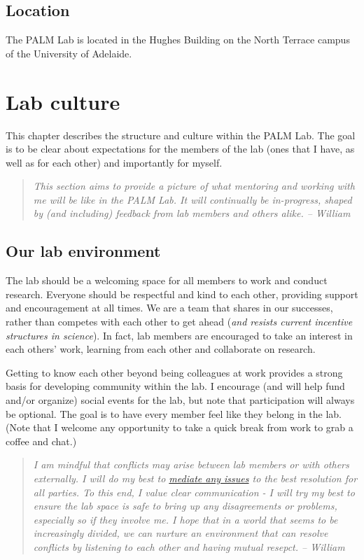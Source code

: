 \documentclass[
]{book}
\begin{document}
\hypertarget{location}{%
\section{Location}\label{location}}

The PALM Lab is located in the Hughes Building on the North Terrace campus of the University of Adelaide.

\hypertarget{lab-culture}{%
\chapter{Lab culture}\label{lab-culture}}

This chapter describes the structure and culture within the PALM Lab. The goal is to be clear about expectations for the members of the lab (ones that I have, as well as for each other) and importantly for myself.

\begin{quote}
\emph{This section aims to provide a picture of what mentoring and working with me will be like in the PALM Lab. It will continually be in-progress, shaped by (and including) feedback from lab members and others alike. -- William}
\end{quote}

\hypertarget{lab-environment}{%
\section{Our lab environment}\label{lab-environment}}

The lab should be a welcoming space for all members to work and conduct research. Everyone should be respectful and kind to each other, providing support and encouragement at all times. We are a team that shares in our successes, rather than competes with each other to get ahead (\emph{and resists current incentive structures in science}). In fact, lab members are encouraged to take an interest in each others' work, learning from each other and collaborate on research.

Getting to know each other beyond being colleagues at work provides a strong basis for developing community within the lab. I encourage (and will help fund and/or organize) social events for the lab, but note that participation will always be optional. The goal is to have every member feel like they belong in the lab. (Note that I welcome any opportunity to take a quick break from work to grab a coffee and chat.)

\begin{quote}
\emph{I am mindful that conflicts may arise between lab members or with others externally. I will do my best to \protect\hyperlink{conflicts}{mediate any issues} to the best resolution for all parties. To this end, I value clear communication - I will try my best to ensure the lab space is safe to bring up any disagreements or problems, especially so if they involve me. I hope that in a world that seems to be increasingly divided, we can nurture an environment that can resolve conflicts by listening to each other and having mutual resepct. -- William}
\end{quote}
\end{document}
